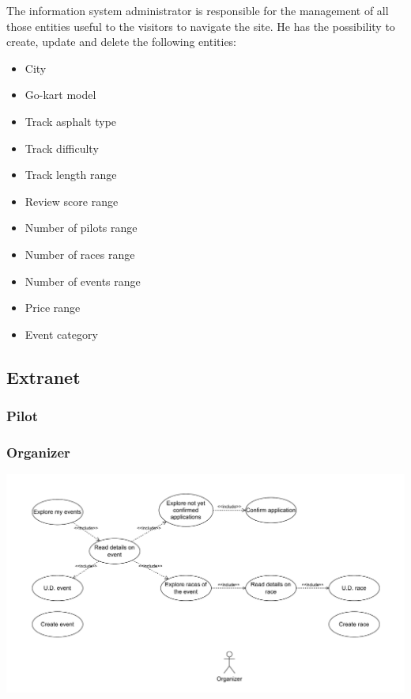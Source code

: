 \documentclass{beamer}
\begin{document}
\begin{frame}
    The information system administrator is responsible for the management of 
    all those entities useful to the visitors to navigate the site.
    He has the possibility to create, update and delete the following entities:
    \begin{itemize}
        \item City
        \item Go-kart model
        \item Track asphalt type
        \item Track difficulty
        \item Track length range
        \item Review score range
        \item Number of pilots range
        \item Number of races range
        \item Number of events range
        \item Price range
        \item Event category
    \end{itemize} 
\end{frame}

\subsection*{Extranet}

\subsubsection*{Pilot}

\begin{frame}
    \frametitle{Organizer}
    \centering
    \includegraphics[width=0.9\linewidth]{drawio/organizer.pdf}
\end{frame}
\end{document}
